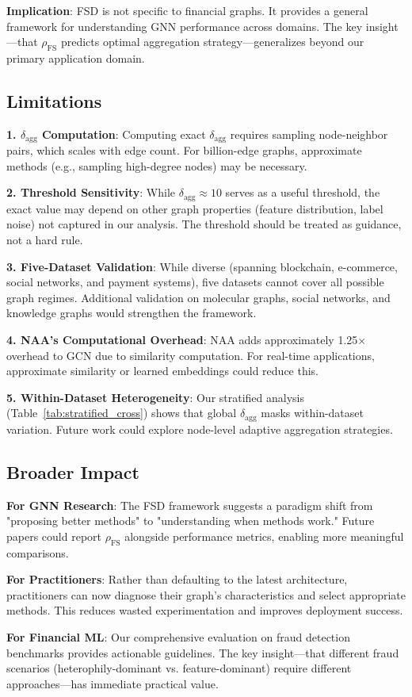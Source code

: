 \textbf{Implication}: FSD is not specific to financial graphs. It provides a general framework for understanding GNN performance across domains. The key insight---that $\rho_{\text{FS}}$ predicts optimal aggregation strategy---generalizes beyond our primary application domain.

\subsection{Limitations}

\textbf{1. $\delta_{\text{agg}}$ Computation}: Computing exact $\delta_{\text{agg}}$ requires sampling node-neighbor pairs, which scales with edge count. For billion-edge graphs, approximate methods (e.g., sampling high-degree nodes) may be necessary.

\textbf{2. Threshold Sensitivity}: While $\delta_{\text{agg}} \approx 10$ serves as a useful threshold, the exact value may depend on other graph properties (feature distribution, label noise) not captured in our analysis. The threshold should be treated as guidance, not a hard rule.

\textbf{3. Five-Dataset Validation}: While diverse (spanning blockchain, e-commerce, social networks, and payment systems), five datasets cannot cover all possible graph regimes. Additional validation on molecular graphs, social networks, and knowledge graphs would strengthen the framework.

\textbf{4. NAA's Computational Overhead}: NAA adds approximately 1.25$\times$ overhead to GCN due to similarity computation. For real-time applications, approximate similarity or learned embeddings could reduce this.

\textbf{5. Within-Dataset Heterogeneity}: Our stratified analysis (Table~\ref{tab:stratified_cross}) shows that global $\delta_{\text{agg}}$ masks within-dataset variation. Future work could explore node-level adaptive aggregation strategies.

\subsection{Broader Impact}

\textbf{For GNN Research}: The FSD framework suggests a paradigm shift from "proposing better methods" to "understanding when methods work." Future papers could report $\rho_{\text{FS}}$ alongside performance metrics, enabling more meaningful comparisons.

\textbf{For Practitioners}: Rather than defaulting to the latest architecture, practitioners can now diagnose their graph's characteristics and select appropriate methods. This reduces wasted experimentation and improves deployment success.

\textbf{For Financial ML}: Our comprehensive evaluation on fraud detection benchmarks provides actionable guidelines. The key insight---that different fraud scenarios (heterophily-dominant vs. feature-dominant) require different approaches---has immediate practical value.

